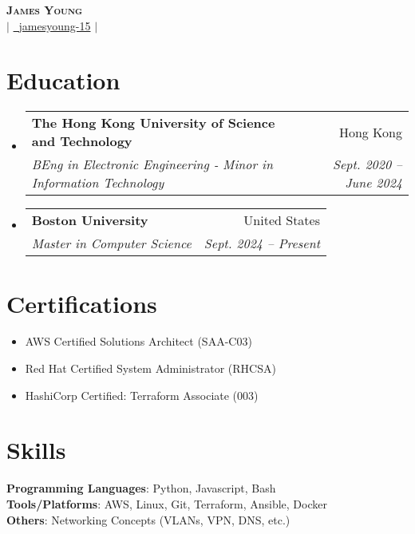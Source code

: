 \documentclass[letterpaper,12pt]{article}
\makeatletter
\newcommand{\resumeSubheading}[4]{
  \vspace{-2pt}\item
    \begin{tabular*}{0.97\textwidth}[t]{l@{\extracolsep{\fill}}r}
      \textbf{#1} & #2 \\
      \textit{\small#3} & \textit{\small #4} \\
    \end{tabular*}\vspace{-7pt}
}
\newcommand{\resumeSubHeadingListStart}{\begin{itemize}[leftmargin=0.05in, label={}]}
\newcommand{\resumeSubHeadingListEnd}{\end{itemize}}
\makeatother
\begin{document}
\begin{center}
    \textbf{\Huge \scshape James Young} \\ \vspace{3pt}
    \href{mailto:jyyoung@bu.edu}{} $|$ 
    \href{https://github.com/jamesyoung-15} {\faGithub\ {jamesyoung-15}} $|$
    \href{https://linkedin.com/in/jamesyyoung}{}
\end{center}


\section{Education}
  \resumeSubHeadingListStart
    \resumeSubheading
      {The Hong Kong University of Science and Technology}{Hong Kong}
      {BEng in Electronic Engineering - Minor in Information Technology}{Sept. 2020 -- June 2024}
  \resumeSubHeadingListEnd
  \resumeSubHeadingListStart
    \resumeSubheading
      {Boston University}{United States}
      {Master in Computer Science}{Sept. 2024 -- Present}
  \resumeSubHeadingListEnd

\section{Certifications}
\vspace{2pt}
        
        \begin{itemize}[itemsep=-1pt, parsep=3pt]
        \small
            \item AWS Certified Solutions Architect (SAA-C03)
            \item Red Hat Certified System Administrator (RHCSA)
            \item HashiCorp Certified: Terraform Associate (003)
        \end{itemize}

\section{Skills}
 \begin{itemize}[leftmargin=0.15in, label={}]
    \small{\item{
     \textbf{Programming Languages}{: Python, Javascript, Bash} \\
     \textbf{Tools/Platforms}{: AWS, Linux, Git, Terraform, Ansible, Docker} \\ 
     \textbf{Others}{: Networking Concepts (VLANs, VPN, DNS, etc.)} \\
    }}
 \end{itemize}
\end{document}
